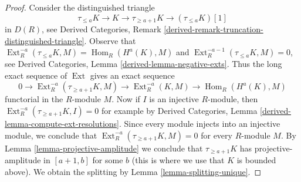 \documentclass[10pt,a4paper]{amsart}
\theoremstyle{plain}
\theoremstyle{definition}
\theoremstyle{remark}
\numberwithin{equation}{subsection}
\def\Hom{\mathop{\mathrm{Hom}}\nolimits}
\def\Ext{\mathop{\mathrm{Ext}}\nolimits}
\begin{document}
\begin{proof}
Consider the distinguished triangle
$$
\tau_{\leq a}K \to K \to \tau_{\geq a + 1}K \to (\tau_{\leq a}K)[1]
$$
in $D(R)$, see Derived Categories, Remark
\ref{derived-remark-truncation-distinguished-triangle}.
Observe that
$\Ext^{-a}_R(\tau_{\leq a}K, M) = \Hom_R(H^a(K), M)$
and
$\Ext^{-a - 1}_R(\tau_{\leq a}K, M) = 0$, see
Derived Categories, Lemma \ref{derived-lemma-negative-exts}. Thus
the long exact sequence of $\Ext$ gives an exact sequence
$$
0 \to
\Ext^{-a}_R(\tau_{\geq a + 1}K, M) \to
\Ext^{-a}_R(K, M) \to
\Hom_R(H^a(K), M)
$$
functorial in the $R$-module $M$.
Now if $I$ is an injective $R$-module, then
$\Ext^{-a}_R(\tau_{\geq a + 1}K, I) = 0$ for example by
Derived Categories, Lemma \ref{derived-lemma-compute-ext-resolutions}.
Since every module injects into an injective module,
we conclude that $\Ext^{-a}_R(\tau_{\geq a + 1}K, M) = 0$
for every $R$-module $M$. By Lemma \ref{lemma-projective-amplitude}
we conclude that $\tau_{\geq a + 1}K$ has projective-amplitude
in $[a + 1, b]$ for some $b$ (this is where we use that $K$
is bounded above). We obtain the splitting by
Lemma \ref{lemma-splitting-unique}.
\end{proof}
\end{document}
